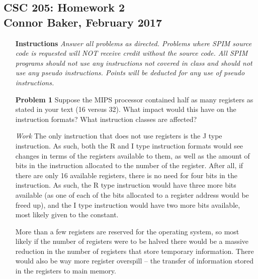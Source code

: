 \documentclass[12pt]{article}
\begin{document}
\begin{center}
  \subsection*{CSC 205: Homework 2\\Connor Baker, February 2017}
\end{center}
\begin{enumerate}
  \item[\textbf{Instructions}] \textit{Answer all problems as directed.  Problems where SPIM source code is requested will NOT receive credit without the source code.  All SPIM programs should not use any instructions not covered in class and should not use any pseudo instructions.  Points will be deducted for any use of pseudo instructions.}
\end{enumerate}

\begin{enumerate}
  \item[\textbf{Problem 1}] Suppose the MIPS processor contained half as many registers as stated in your text (16 versus 32).  What impact would this have on the instruction formats?  What instruction classes are affected?
\end{enumerate}

\begin{enumerate}
  \item[\textit{Work}] The only instruction that does not use registers is the J type instruction. As such, both the R and I type instruction formats would see changes in terms of the registers available to them, as well as the amount of bits in the instruction allocated to the number of the register. After all, if there are only 16 available registers, there is no need for four bits in the instruction. As such, the R type instruction would have three more bits available (as one of each of the bits allocated to a register address would be freed up), and the I type instruction would have two more bits available, most likely given to the constant.

  \item[] More than a few registers are reserved for the operating system, so most likely if the number of registers were to be halved there would be a massive reduction in the number of registers that store temporary information. There would also be way more register overspill -- the transfer of information stored in the registers to main memory.
\end{enumerate}
\end{document}
